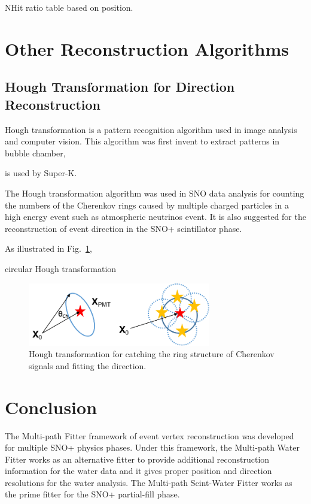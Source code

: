 NHit ratio table based on position.




\section{Other Reconstruction Algorithms}
\subsection{Hough Transformation for Direction Reconstruction}

Hough transformation is a pattern recognition algorithm used in image analysis and computer vision\cite{davies1997machine}. This algorithm was first invent to extract patterns in bubble chamber\cite{houghwiki}, 

is used by Super-K\cite{shiozawa1999reconstruction}.

The Hough transformation algorithm was used in SNO data analysis for counting the numbers of the Cherenkov rings caused by multiple charged particles in a high energy event such as atmospheric neutrinos event\cite{bonventre2014neutron}. It is also suggested for the reconstruction of event direction in the SNO+ scintillator phase\cite{houghTransform}.

As illustrated in Fig.~\ref{houghTrans}, 


circular Hough transformation
\begin{figure}[!htb]
	\centering
	\includegraphics[width=8cm]{houghTransform.png}
	\caption{Hough transformation for catching the ring structure of Cherenkov signals and fitting the direction.}
	\label{houghTrans}
\end{figure}

\section{Conclusion}
The Multi-path Fitter framework of event vertex reconstruction was developed for multiple SNO+ physics phases. Under this framework, the Multi-path Water Fitter works as an alternative fitter to provide additional reconstruction information for the water data and it gives proper position and direction resolutions for the water analysis. The Multi-path Scint-Water Fitter works as the prime fitter for the SNO+ partial-fill phase.